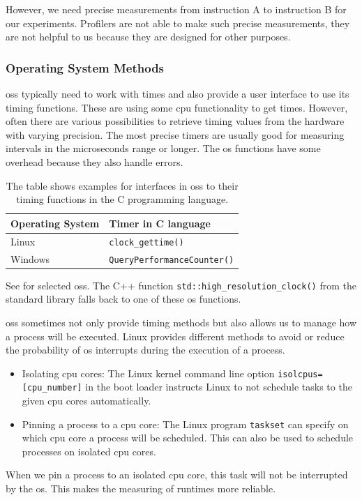 However, we need precise measurements from instruction A to instruction B for our experiments.
Profilers are not able to make such precise measurements, \ie they are not helpful to us because they are designed for other purposes.

\subsubsection{Operating System Methods}
\tobechecked
\acp{os} typically need to work with times and also provide a user interface to use its timing functions.
These are using some \ac{cpu} functionality to get times.
However, often there are various possibilities to retrieve timing values from the hardware with varying precision.
The most precise timers are usually good for measuring intervals in the microseconds range or longer.
The \ac{os} functions have some overhead because they also handle errors.
\begin{table}
    \centering
    \begin{tabular}{@{}ll@{}}
        \toprule
        Operating System & Timer in C language \\
        \midrule
        Linux & \lstinline|clock_gettime()| \\
        Windows & \lstinline|QueryPerformanceCounter()| \\
        \bottomrule
    \end{tabular}
    \caption[Operating System interfaces to their timing functions]
    {
        The table shows examples for interfaces in \acp{os} to their timing functions in the C programming language.
    }
    \label{tab:approach:timing_functions}
\end{table}
See  for selected \acp{os}.
The C++ function \lstinline|std::high_resolution_clock()| from the standard library falls back to one of these \ac{os} functions.

\acp{os} sometimes not only provide timing methods but also allows us to manage how a process will be executed.
Linux provides different methods to avoid or reduce the probability of \ac{os} interrupts during the execution of a process.
\begin{itemize}
    \item Isolating \ac{cpu} cores: 
    The Linux kernel command line option \lstinline|isolcpus=[cpu_number]| in the boot loader instructs Linux to not schedule tasks to the given \ac{cpu} cores automatically.
    \item Pinning a process to a \ac{cpu} core: 
    The Linux program \lstinline|taskset| can specify on which \ac{cpu} core a process will be scheduled.
    This can also be used to schedule processes on isolated \ac{cpu} cores.
\end{itemize}
When we pin a process to an isolated \ac{cpu} core, this task will not be interrupted by the \ac{os}.
This makes the measuring of runtimes more reliable.

